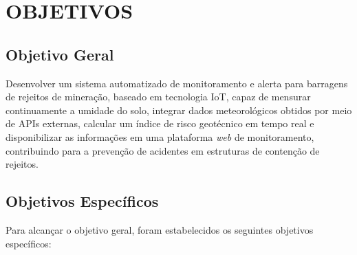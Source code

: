 \chapter{OBJETIVOS}
\label{cap:objetivos}

\section{Objetivo Geral}
\label{sec:objetivo-geral}

Desenvolver um sistema automatizado de monitoramento e alerta para
barragens de rejeitos de mineração, baseado em tecnologia IoT, capaz
de mensurar continuamente a umidade do solo, integrar dados
meteorológicos obtidos por meio de APIs externas, calcular um índice
de risco geotécnico em tempo real e disponibilizar as informações em
uma plataforma \textit{web} de monitoramento, contribuindo para a
prevenção de acidentes em estruturas de contenção de rejeitos.

\section{Objetivos Específicos}
\label{sec:objetivos-especificos}

Para alcançar o objetivo geral, foram estabelecidos os seguintes
objetivos específicos:

